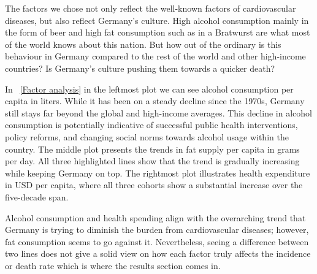 The factors we chose not only reflect the well-known factors of cardiovascular diseases, but also reflect Germany's culture. High alcohol consumption mainly in the form of beer and high fat consumption such as in a Bratwurst are what most of the world knows about this nation. But how out of the ordinary is this behaviour in Germany compared to the rest of the world and other high-income countries? Is Germany's culture pushing them towards a quicker death?

In \figurename~\ref{Factor analysis} in the leftmost plot we can see alcohol consumption per capita in liters. While it has been on a steady decline since the 1970s, Germany still stays far beyond the global and high-income averages. This decline in alcohol consumption is potentially indicative of successful public health interventions, policy reforms, and changing social norms towards alcohol usage within the country. The middle plot presents the trends in fat supply per capita in grams per day. All three highlighted lines show that the trend is gradually increasing while keeping Germany on top. The rightmost plot illustrates health expenditure in USD per capita, where all three cohorts show a substantial increase over the five-decade span.

Alcohol consumption and health spending align with the overarching trend that Germany is trying to diminish the burden from cardiovascular diseases; however, fat consumption seems to go against it. Nevertheless, seeing a difference between two lines does not give a solid view on how each factor truly affects the incidence or death rate which is where the results section comes in.